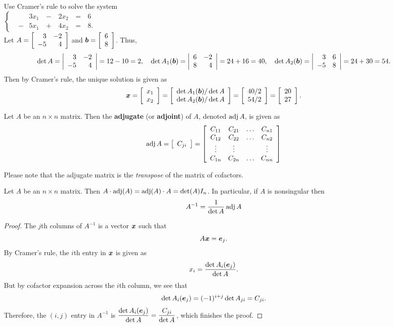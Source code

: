 \begin{Exam} Use Cramer's rule to solve the system \\
$\left\{\begin{alignedat}{100}
&&3x_1\ &-\ &2x_2\ &=\ &6&\\
&-&5x_1\ &+\ &4x_2\ & =\ &8.&
\end{alignedat}\right.$\\

Let $A = \mtx{rr}{3&-2\\-5&4}$ and $\bb b = \vr{6\\8}$.  Thus, 
\[\det A = \dtx{rr}{3&-2\\-5&4} = 12-10 = 2,\quad \det A_1(\bb b) = \dtx{rr}{6&-2\\8&4} = 24+16 = 40,\quad \det A_2(\bb b) = \dtx{rr}{3&6\\-5&8} = 24+30 = 54.\] 
Then by Cramer's rule, the unique solution is given as
\[\bb x = \vr{x_1\\x_2} = \vr{\det A_1(\bb b)/\det A \\ \det A_2(\bb b)/\det A} = \vr{40/2\\ 54/2} = \vr{20\\27}. \qedhere\]
\end{Exam}\vs

\begin{Def} Let $A$ be an $n\times n$ matrix. Then the \textbf{adjugate} (or \textbf{adjoint}) of $A$, denoted $\adj A$, is given as 
\[\adj A = \mtx{c}{C_{ji}} = \mtx{cccc}{C_{11} & C_{21} & \ldots & C_{n1} \\ C_{12} & C_{22} & \ldots & C_{n2} \\ \vdots & \vdots & & \vdots \\ C_{1n} & C_{2n} & \ldots & C_{nn}}\]
\end{Def}\vs

Please note that the adjugate matrix is the \emph{transpose} of the matrix of cofactors.\\

\begin{Thm}\label{thm:adjugate} Let $A$ be an $n\times n$ matrix. Then $A\cdot \adj(A) = \adj(A) \cdot A = \det(A)I_n$. In particular, if $A$ is nonsingular then 
\[A^{-1} = \dfrac{1}{\det A}\adj A\]
\end{Thm}
\begin{proof}
The $j$th columns of $A^{-1}$ is a vector $\bb x$ such that \[A\bb x = \bb e_j.\] By Cramer's rule, the $i$th entry in $\bb x$ is given as
\[x_i = \dfrac{\det A_i(\bb e_j)}{\det A}.\] But by cofactor expansion across the $i$th column, we see that \[\det A_i(\bb e_j) = (-1)^{i+j}\det A_{ji} = C_{ji}.\] Therefore, the $(i,j)$ entry in $A^{-1}$ is $\dfrac{\det A_i(\bb e_j)}{\det A} =  \dfrac{C_{ji}}{\det A}$, which finishes the proof.
\end{proof}\vs

